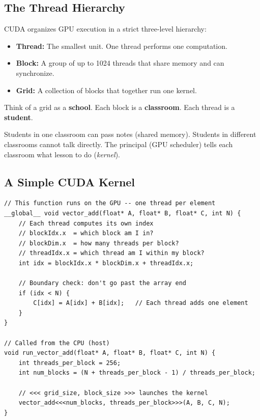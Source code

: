 \documentclass[10pt, oneside, openany]{book}
\newcommand{\analogybox}[2]{\begin{tcolorbox}[analogystyle, title={Analogy: #1}]#2\end{tcolorbox}}
\begin{document}
\subsection{The Thread Hierarchy}

CUDA organizes GPU execution in a strict three-level hierarchy:

\begin{itemize}
  \item \textbf{Thread:} The smallest unit.  One thread performs one computation.
  \item \textbf{Block:} A group of up to 1024 threads that share memory and can synchronize.
  \item \textbf{Grid:} A collection of blocks that together run one kernel.
\end{itemize}

\analogybox{School Analogy}{
Think of a grid as a \textbf{school}.
Each block is a \textbf{classroom}.
Each thread is a \textbf{student}.

Students in one classroom can pass notes (shared memory).
Students in different classrooms cannot talk directly.
The principal (GPU scheduler) tells each classroom what lesson to do (\textit{kernel}).
}

\subsection{A Simple CUDA Kernel}

\begin{lstlisting}[style=cstyle, caption={A simple CUDA vector addition kernel},
                   label={lst:cuda_add}]
// This function runs on the GPU -- one thread per element
__global__ void vector_add(float* A, float* B, float* C, int N) {
    // Each thread computes its own index
    // blockIdx.x  = which block am I in?
    // blockDim.x  = how many threads per block?
    // threadIdx.x = which thread am I within my block?
    int idx = blockIdx.x * blockDim.x + threadIdx.x;

    // Boundary check: don't go past the array end
    if (idx < N) {
        C[idx] = A[idx] + B[idx];   // Each thread adds one element
    }
}

// Called from the CPU (host)
void run_vector_add(float* A, float* B, float* C, int N) {
    int threads_per_block = 256;
    int num_blocks = (N + threads_per_block - 1) / threads_per_block;

    // <<< grid_size, block_size >>> launches the kernel
    vector_add<<<num_blocks, threads_per_block>>>(A, B, C, N);
}
\end{lstlisting}
\end{document}
